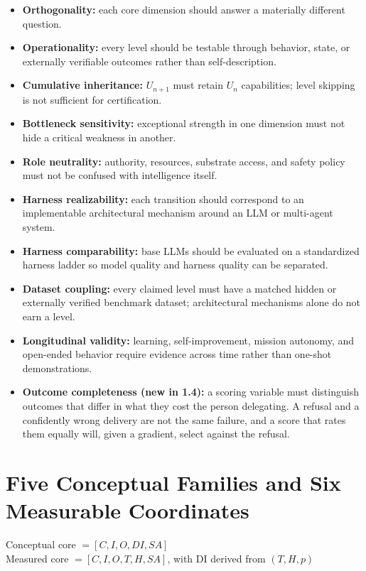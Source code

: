 \documentclass[11pt]{article}
\theoremstyle{definition}
\begin{document}
\begin{itemize}
\item \textbf{Orthogonality:} each core dimension should answer a materially different question.
\item \textbf{Operationality:} every level should be testable through behavior, state, or externally verifiable outcomes rather than self-description.
\item \textbf{Cumulative inheritance:} $U_{n+1}$ must retain $U_n$ capabilities; level skipping is not sufficient for certification.
\item \textbf{Bottleneck sensitivity:} exceptional strength in one dimension must not hide a critical weakness in another.
\item \textbf{Role neutrality:} authority, resources, substrate access, and safety policy must not be confused with intelligence itself.
\item \textbf{Harness realizability:} each transition should correspond to an implementable architectural mechanism around an LLM or multi-agent system.
\item \textbf{Harness comparability:} base LLMs should be evaluated on a standardized harness ladder so model quality and harness quality can be separated.
\item \textbf{Dataset coupling:} every claimed level must have a matched hidden or externally verified benchmark dataset; architectural mechanisms alone do not earn a level.
\item \textbf{Longitudinal validity:} learning, self-improvement, mission autonomy, and open-ended behavior require evidence across time rather than one-shot demonstrations.
\item \textbf{Outcome completeness (new in 1.4):} a scoring variable must distinguish outcomes that differ in what they cost the person delegating. A refusal and a confidently wrong delivery are not the same failure, and a score that rates them equally will, given a gradient, select against the refusal.
\end{itemize}

\section{Five Conceptual Families and Six Measurable Coordinates}

\begin{center}
Conceptual core $= [C, I, O, DI, SA]$\\
Measured core $= [C, I, O, T, H, SA]$, with DI derived from $(T, H, p)$
\end{center}
\end{document}
